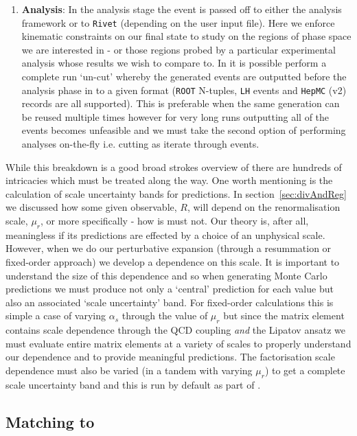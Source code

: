 \begin{enumerate}
			\item \textbf{Analysis}: In the analysis stage the event is passed off to either
			the \HEJ analysis framework or to \texttt{Rivet} (depending on the user input file).
			Here we enforce kinematic constraints on our final state to study on the regions of
			phase space we are interested in - or those regions probed by a particular
			experimental analysis whose results we wish to compare to.  In \HEJ it is possible
			perform a complete run `un-cut' whereby the generated events are outputted before
			the analysis phase in to a given format (\texttt{ROOT} N-tuples, \texttt{LH} events
			and \texttt{HepMC} (v2) records are all supported).  This is preferable when the same
			generation can be reused multiple times however for very long runs outputting all of the
			events becomes unfeasible and we must take the second option of performing \HEJ analyses
			on-the-fly i.e. cutting as iterate through events.
		\end{enumerate}

		While this breakdown is a good broad strokes overview of \HEJ there are hundreds of intricacies
		which must be treated along the way.  One worth mentioning is the calculation of scale uncertainty
		bands for predictions.  In section~\eqref{sec:divAndReg} we discussed how some given observable, $R$,
		will depend on the renormalisation scale, $\mu_r$, or more specifically - how is must not.  Our theory
		is, after all, meaningless if its predictions are effected by a choice of an unphysical scale.  However,
		when we do our perturbative expansion (through a resummation or fixed-order approach) we develop a
		dependence on this scale.  It is important to understand the size of this dependence and so when
		generating Monte Carlo predictions we must produce not only a `central' prediction for each value but
		also an associated `scale uncertainty' band.  For fixed-order calculations this is simple a case of
		varying $\alpha_s$ through the value of $\mu_r$ but since the \hej matrix element contains scale
		dependence through the QCD coupling \emph{and} the Lipatov ansatz we must evaluate entire matrix elements
		at a variety of scales to properly understand our dependence and to provide meaningful predictions.  The
		factorisation scale dependence must also be varied (in a tandem with varying $\mu_r$) to get a complete
		scale uncertainty band and this is run by default as part of \HEJ.

	\subsection{Matching to \ARIADNE}

